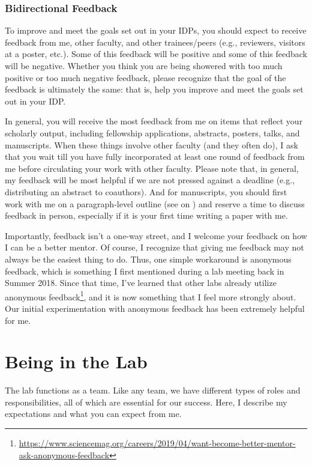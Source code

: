 \documentclass[letterpaper,12pt,oneside]{memoir}
\begin{document}
\subsection{Bidirectional Feedback}
To improve and meet the goals set out in your IDPs, you should expect to receive feedback from me, other faculty, and other trainees/peers (e.g., reviewers, visitors at a poster, etc.). Some of this feedback will be positive and some of this feedback will be negative. Whether you think you are being showered with too much positive or too much negative feedback, please recognize that the goal of the feedback is ultimately the same: that is, help you improve and meet the goals set out in your IDP. 

In general, you will receive the most feedback from me on items that reflect your scholarly output, including fellowship applications, abstracts, posters, talks, and manuscripts. When these things involve other faculty (and they often do), I ask that you wait till you have fully incorporated at least one round of feedback from me before circulating your work with other faculty. Please note that, in general, my feedback will be most helpful if we are not pressed against a deadline (e.g., distributing an abstract to coauthors). And for manuscripts, you should first work with me on a paragraph-level outline (see  on ) and reserve a time to discuss feedback in person, especially if it is your first time writing a paper with me.

Importantly, feedback isn't a one-way street, and I welcome your feedback on how I can be a better mentor. Of course, I recognize that giving me feedback may not always be the easiest thing to do. Thus, one simple workaround is anonymous feedback, which is something I first mentioned during a lab meeting back in Summer 2018. Since that time, I've learned that other labs already utilize anonymous feedback\footnote{\url{https://www.sciencemag.org/careers/2019/04/want-become-better-mentor-ask-anonymous-feedback}}, and it is now something that I feel more strongly about. Our initial experimentation with anonymous feedback has been extremely helpful for me.


\chapter{Being in the Lab}

The lab functions as a team. Like any team, we have different types of roles and responsibilities, all of which are essential for our success. Here, I describe my expectations and what you can expect from me. 
\end{document}
